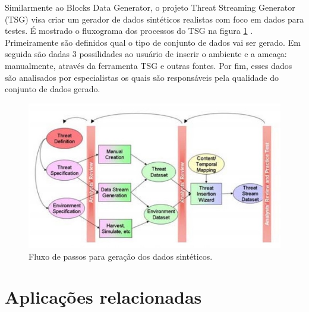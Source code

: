 \documentclass[
	12pt,				%
	openright,			%
	twoside,			%
	a4paper,			%
	english,			%
	brazil				%
	]{abntex2}
\begin{document}
		Similarmente ao Blocks Data Generator, o projeto Threat Streaming Generator (TSG) visa criar um gerador de dados sintéticos realistas com foco em dados para testes.
		É mostrado o fluxograma dos processos do TSG na figura \ref{fig:whitingetal} .
		Primeiramente são definidos qual o tipo de conjunto de dados vai ser gerado.
		Em seguida são dadas 3 possilidades ao usuário de inserir o ambiente e a ameaça: manualmente, através da ferramenta TSG e outras fontes.
		Por fim, esses dados são analisados por especialistas os quais são responsáveis pela qualidade do conjunto de dados gerado.
		\begin{figure}[h!]
			\centering
			\includegraphics[width=\linewidth]{./figures/TrabalhosRelacionados/whitingetal.jpg}
			\caption{Fluxo de passos para geração dos dados sintéticos.}
			\label{fig:whitingetal}
		\end{figure}

	
	\section{Aplicações relacionadas}
\end{document}

